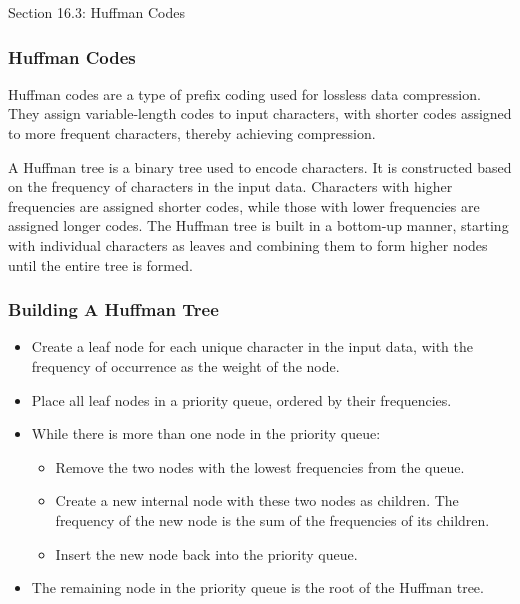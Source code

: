\begin{notes}{Section 16.3: Huffman Codes}
    \subsubsection*{Huffman Codes}

    Huffman codes are a type of prefix coding used for lossless data compression. They assign variable-length codes to input characters, with shorter codes assigned to more frequent characters, thereby 
    achieving compression. 
    
    A Huffman tree is a binary tree used to encode characters. It is constructed based on the frequency of characters in the input data. Characters with higher frequencies are assigned shorter codes, 
    while those with lower frequencies are assigned longer codes. The Huffman tree is built in a bottom-up manner, starting with individual characters as leaves and combining them to form higher nodes 
    until the entire tree is formed. \vspace*{1em}
    
    \subsubsection*{Building A Huffman Tree}

    \begin{itemize}
        \item Create a leaf node for each unique character in the input data, with the frequency of occurrence as the weight of the node.
        \item Place all leaf nodes in a priority queue, ordered by their frequencies.
        \item While there is more than one node in the priority queue:
        \begin{itemize}
            \item Remove the two nodes with the lowest frequencies from the queue.
            \item Create a new internal node with these two nodes as children. The frequency of the new node is the sum of the frequencies of its children.
            \item Insert the new node back into the priority queue.
        \end{itemize}
        \item The remaining node in the priority queue is the root of the Huffman tree.
    \end{itemize}
    

\end{notes}
